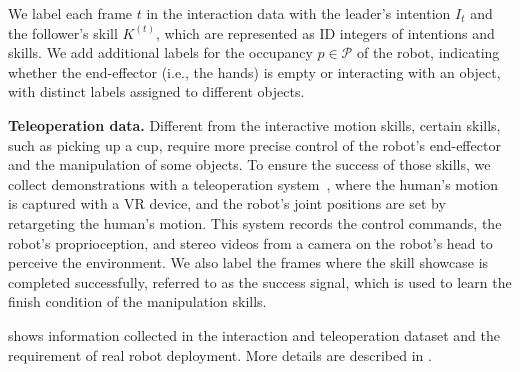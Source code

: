We label each frame $t$ in the interaction data with the leader's intention $I_t$ and the follower's skill $K^{(t)}$, which are represented as ID integers of intentions and skills. We add additional labels for the occupancy $p \in \mathcal{P}$ of the robot, 
indicating whether the end-effector (i.e., the hands) is empty or interacting with an object, with distinct labels assigned to different objects.

\noindent\textbf{Teleoperation data.}
Different from the interactive motion skills, 
certain skills, such as picking up a cup, require more precise control of the robot's end-effector and the manipulation of some objects.
To ensure the success of those skills, 
we collect demonstrations with a teleoperation system~\cite{cheng2024tv}, where the human's motion is captured with a VR device, and the robot's joint positions are set by retargeting the human's motion.
This system records the control commands, the robot's proprioception, and stereo videos from a camera on the robot's head to perceive the environment.
We also label the frames where the skill showcase is completed successfully, referred to as the success signal, which is used to learn the finish condition of the manipulation skills.



 shows information collected in the interaction and teleoperation dataset and the requirement of real robot deployment. More details are described in .

